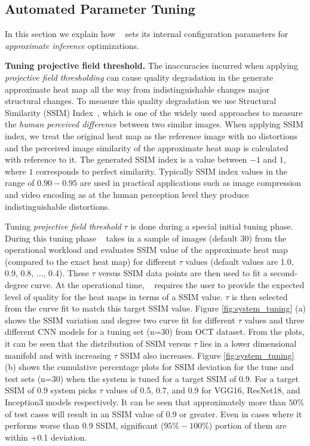 \subsection{Automated Parameter Tuning}
In this section we explain how \system~ sets its internal configuration parameters for \textit{approximate inference} optimizations.

\vspace{2mm}
\noindent \textbf{Tuning projective field threshold.}
The inaccuracies incurred when applying \textit{projective field thresholding} can cause quality degradation in the generate approximate heat map all the way from indistinguishable changes major structural changes.
To measure this quality degradation we use Structural Similarity (SSIM) Index~\cite{wang2004image}, which is one of the widely used approaches to measure the \textit{human perceived difference} between two similar images.
When applying SSIM index, we treat the original heat map as the reference image with no distortions and the perceived image similarity of the approximate heat map is calculated with reference to it.
The generated SSIM index is a value between $-1$ and $1$, where $1$ corresponds to perfect similarity.
Typically SSIM index values in the range of $0.90-0.95$ are used in practical applications such as image compression and video encoding as at the human perception level they produce indistinguishable distortions.

Tuning \textit{projective field threshold} $\tau$ is done during a special initial tuning phase.
During this tuning phase \system~ takes in a sample of images (default 30) from the operational workload and evaluates SSIM value of the approximate heat map (compared to the exact heat map) for different $\tau$ values (default values are 1.0, 0.9, 0.8, ..., 0.4).
These $\tau$ versus SSIM data points are then used to fit a second-degree curve.
At the operational time, \system~ requires the user to provide the expected level of quality for the heat maps in terms of a SSIM value.
$\tau$ is then selected from the curve fit to match this target SSIM value.
Figure \ref{fig:system_tuning} (a) shows the SSIM variation and degree two curve fit for different $\tau$ values and three different CNN models for a tuning set (n=30) from OCT dataset.
From the plots, it can be seen that the distribution of SSIM versus $\tau$ lies in a lower dimensional manifold and with increasing $\tau$ SSIM also increases.
Figure \ref{fig:system_tuning} (b) shows the cumulative percentage plots for SSIM deviation for the tune and test sets (n=30) when the system is tuned for a target SSIM of 0.9.
For a target SSIM of 0.9 system picks $\tau$ values of 0.5, 0.7, and 0.9 for VGG16, ResNet18, and Inception3 models respectively.
It can be seen that approximately more than $50\%$ of test cases will result in an SSIM value of 0.9 or greater.
Even in cases where it performs worse than 0.9 SSIM, significant ($95\%-100\%$) portion of them are within +0.1 deviation.

